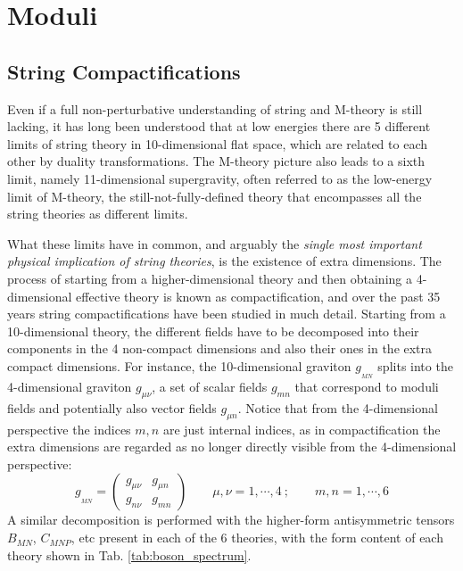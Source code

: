 \startdocument 

\section{Moduli}
\label{ModuliSection}

\subsection{String Compactifications}

Even if a full non-perturbative understanding of string and M-theory is still lacking, it has long been understood that at low energies there are 5
different limits of string theory in 10-dimensional flat space, which are related to each other by duality transformations. 
The M-theory picture also leads to a sixth limit, namely 11-dimensional supergravity, often referred to as the low-energy limit of M-theory, the still-not-fully-defined theory that encompasses all the string theories as different limits. 

What these limits have in common, and arguably the \emph{single most important physical implication of string theories}, is the existence of extra dimensions. The process of starting from a higher-dimensional theory and then obtaining a 4-dimensional effective theory is known as compactification, and over the past 35 years string compactifications have been studied in much detail. Starting from a 10-dimensional theory, the different fields have to be decomposed into their components in the 4 non-compact dimensions and also their ones in the extra compact dimensions. For instance, the 10-dimensional graviton $ g_{_{MN}} $ splits into the 4-dimensional graviton $g_{\mu\nu}$, a set of scalar fields $g_{mn}$ that correspond to moduli fields and potentially also vector fields $g_{\mu n}$. Notice that from the 4-dimensional perspective the indices $m,n$ are just internal indices, as in compactification the extra dimensions are regarded as no longer directly visible from the 4-dimensional perspective:
\begin{equation}
g_{_{MN}}=\begin{pmatrix} g_{\mu\nu} & g_{\mu n} \\
g_{n\nu} & g_{mn}
\end{pmatrix}\qquad \mu,\nu =1, \cdots, 4\ ; \qquad m,n=1,\cdots, 6
\end{equation}
A similar decomposition is performed with the higher-form antisymmetric tensors $B_{MN}$, $C_{MNP}$, etc present in each of the 6 theories, with the form content of each theory shown in Tab. \ref{tab:boson_spectrum}.


